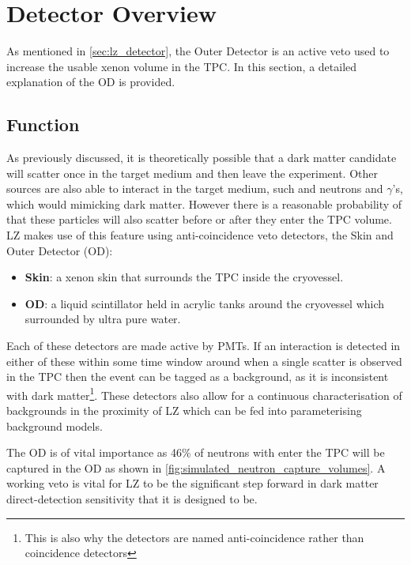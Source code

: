\section{Detector Overview} \label{OD_detector_overview}
\par
As mentioned in \autoref{sec:lz_detector}, the Outer Detector is an active veto used to increase the usable xenon volume in the TPC.
In this section, a detailed explanation of the OD is provided.

\subsection{Function}
\par
As previously discussed, it is theoretically possible that a dark matter candidate will scatter once in the target medium and then leave the experiment.
Other sources are also able to interact in the target medium, such and neutrons and $\gamma$'s, which would mimicking dark matter.
However there is a reasonable probability of that these particles will also scatter before or after they enter the TPC volume.
LZ makes use of this feature using anti-coincidence veto detectors, the Skin and Outer Detector (OD):
\begin{itemize}
    \item \textbf{Skin}: a xenon skin that surrounds the TPC inside the cryovessel.
    \item \textbf{OD}: a liquid scintillator held in acrylic tanks around the cryovessel which surrounded by ultra pure water.
\end{itemize}
Each of these detectors are made active by PMTs.
If an interaction is detected in either of these within some time window around when a single scatter is observed in the TPC then the event can be tagged as a background, as it is inconsistent with dark matter\footnote{This is also why the detectors are named anti-coincidence rather than coincidence detectors}.
These detectors also allow for a continuous characterisation of backgrounds in the proximity of LZ which can be fed into parameterising background models.


\par
The OD is of vital importance as 46\% of neutrons with enter the TPC will be captured in the OD as shown in \autoref{fig:simulated_neutron_capture_volumes}.
A working veto is vital for LZ to be the significant step forward in dark matter direct-detection sensitivity that it is designed to be.




